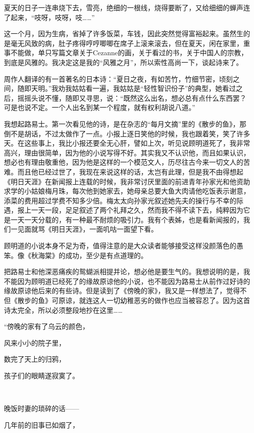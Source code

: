 \par 夏天的日子一连串烧下去，雪亮，绝细的一根线，烧得要断了，又给细细的蝉声连了起来，“吱呀，吱呀，吱……”
\par 这一个月，因为生病，省掉了许多饭菜，车钱，因此突然觉得富裕起来。虽然生的是毫无风致的病，肚子疼得哼哼唧唧在席子上滚来滚去，但在夏天，闲在家里，重事不能做，单只写篇文章关于Cezanne的画，关于看过的书，关于中国人的宗教，到底是风雅的。我决定这是我的“风雅之月”，所以索性高尚一下，谈起诗来了。
\par 周作人翻译的有一首著名的日本诗：“夏日之夜，有如苦竹，竹细节密，顷刻之间，随即天明。”我劝我姑姑看一遍，我姑姑是“轻性智识份子”的典型，她看过之后，摇摇头说不懂，随即又寻思，说：“既然这么出名，想必总有点什么东西罢？可是也说不定。一个人出名到某一个程度，就有权利胡说八道。”
\par 我想起路易士。第一次看见他的诗，是在杂志的“每月文摘”里的《散步的鱼》，那倒不是胡话，不过太做作了一点。小报上逐日笑他的时候，我也跟着笑，笑了许多天。在这些事上，我比小报还要全无心肝，譬如上次，听见说顾明道死了，我非常高兴，理由很简单，因为他的小说写得不好。其实我又不认识他，而且如果认识，想必也有理由敬重他，因为他是这样的一个模范文人，历尽往古今来一切文人的苦难。而且他已经过世了，我现在来说这样的话，太岂有此理，但是我不由得想起《明日天涯》在新闻报上连载的时候，我非常讨厌里面的前进青年孙家光和他资助求学的小姑娘梅月珠，每次他到她家去，她母亲总要大鱼大肉请他吃饭表示谢意，添菜的费用超过学费不知多少倍。梅太太向孙家光叙述她先夫的操行与不幸的际遇，报上一天一段，足足叙述了两个礼拜之久，然而我不得不读下去，纯粹因为它是一天一天分载的，有一种最不耐烦的吸引力。我有个表姊，也是看新闻报的，我们一见面就骂《明日天涯》，一面叽咕一面望下看。
\par 顾明道的小说本身不足为奇，值得注意的是大众读者能够接受这样没颜落色的愚笨。像《秋海棠》的成功，至少是有点道理的。
\par 把路易士和他深恶痛疾的鸳蝴派相提并论，想必他是要生气的。我想说明的是，我不能因为顾明道已经死了的缘故原谅他的小说，也不能因为路易士从前作过好诗的缘故原谅他后来的有些诗。但是读到了《傍晚的家》，我又是一样想法了，觉得不但《散步的鱼》可原谅，就连这人一切幼稚恶劣的做作也应当被容忍了。因为这首诗太完全，所以必须整段地抄在这里……
\par “傍晚的家有了乌云的颜色，
\par 风来小小的院子里，
\par 数完了天上的归鸦，
\par 孩子们的眼睛遂寂寞了。
\par  
\par 晚饭时妻的琐碎的话——
\par 几年前的旧事已如烟了，
